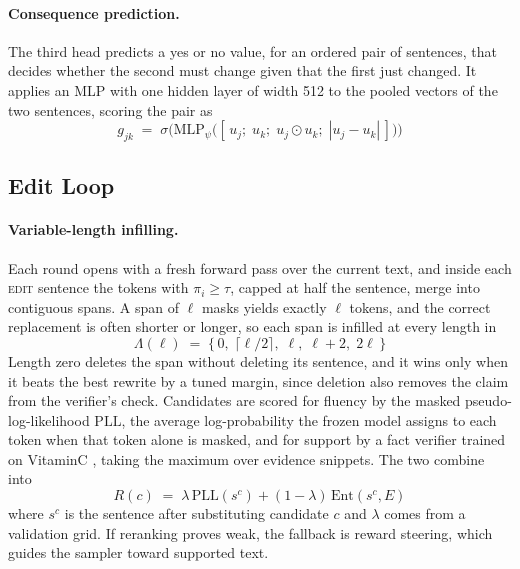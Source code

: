 \documentclass[11pt]{article}
\newcommand{\edit}{\textsc{edit}}
\begin{document}
\paragraph{Consequence prediction.}
The third head predicts a yes or no value, for an ordered pair of sentences, that decides whether the second must change given that the first just changed. It applies an MLP with one hidden layer of width 512 to the pooled vectors of the two sentences, scoring the pair as
\begin{equation}
g_{jk} \;=\; \sigma\!\Big(\mathrm{MLP}_\psi\big([\,u_j;\; u_k;\; u_j \odot u_k;\; |u_j - u_k|\,]\big)\Big)
\label{eq:cons}
\end{equation}

\subsection{Edit Loop}
\label{sec:inference}

\paragraph{Variable-length infilling.}
Each round opens with a fresh forward pass over the current text, and inside each \edit{} sentence the tokens with $\pi_i \ge \tau$, capped at half the sentence, merge into contiguous spans. A span of $\ell$ masks yields exactly $\ell$ tokens, and the correct replacement is often shorter or longer, so each span is infilled at every length in
\begin{equation}
\Lambda(\ell) \;=\; \{\,0,\; \lceil \ell/2 \rceil,\; \ell,\; \ell + 2,\; 2\ell\,\}
\label{eq:lambda}
\end{equation} Length zero deletes the span without deleting its sentence, and it wins only when it beats the best rewrite by a tuned margin, since deletion also removes the claim from the verifier's check. Candidates are scored for fluency by the masked pseudo-log-likelihood $\mathrm{PLL}$, the average log-probability the frozen model assigns to each token when that token alone is masked, and for support by a fact verifier trained on VitaminC \citep{schuster-etal-2021-vitaminc}, taking the maximum over evidence snippets. The two combine into
\begin{equation}
R(c) \;=\; \lambda\, \mathrm{PLL}(s^{c}) + (1 - \lambda)\, \mathrm{Ent}(s^{c}, E)
\label{eq:rerank}
\end{equation}
where $s^c$ is the sentence after substituting candidate $c$ and $\lambda$ comes from a validation grid. If reranking proves weak, the fallback is reward steering, which guides the sampler toward supported text.
\end{document}
